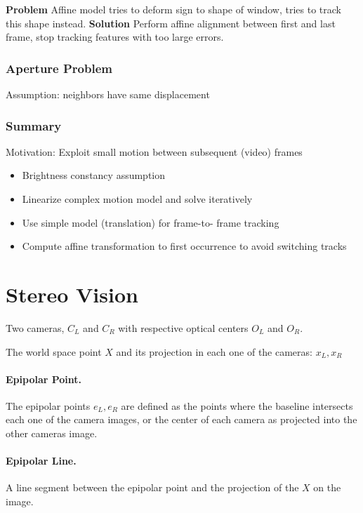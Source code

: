 \textbf{Problem}  Affine model tries to deform sign to shape of window, tries to track this shape instead. 
\textbf{Solution} Perform affine alignment between first and last frame, stop tracking features with too large errors. 

\subsubsection{Aperture Problem}

Assumption: neighbors have same displacement

\subsubsection{Summary}
Motivation: Exploit small motion between subsequent (video) frames

\begin{itemize}
\item  Brightness constancy assumption
\item  Linearize complex motion model and solve iteratively
\item  Use simple model (translation) for frame-to- frame tracking
\item  Compute affine transformation to first occurrence to avoid switching tracks
\end{itemize}


\section{Stereo Vision}

Two cameras, $C_L$ and $C_R$ with respective optical centers $O_L$ and $O_R$.

The world space point $X$ and its projection in each one of the cameras: $x_L, x_R$

\paragraph{Epipolar Point.} The epipolar points $e_L, e_R$ are defined as the points where the baseline intersects each one of the camera images, or the center of each camera as projected into the other cameras image.

\paragraph{Epipolar Line.} A line segment between the epipolar point and the projection of the $X$ on the image.

